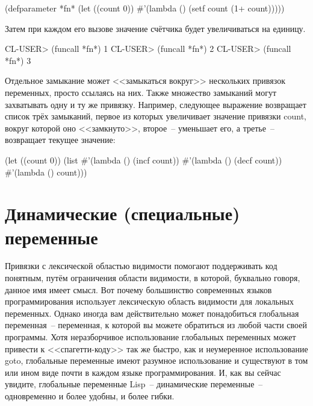 \begin{myverb}
(defparameter *fn* (let ((count 0)) #'(lambda () (setf count (1+ count)))))
\end{myverb}

Затем при каждом его вызове значение счётчика будет увеличиваться на единицу.

\begin{myverb}
CL-USER> (funcall *fn*)
1
CL-USER> (funcall *fn*)
2
CL-USER> (funcall *fn*)
3
\end{myverb}

Отдельное замыкание может <<замыкаться вокруг>> нескольких привязок переменных, просто
ссылаясь на них. Также множество замыканий могут захватывать одну и ту же
привязку. Например, следующее выражение возвращает список трёх замыканий, первое из
которых увеличивает значение привязки count, вокруг которой оно <<замкнуто>>, второе~--
уменьшает его, а третье~-- возвращает текущее значение:

\begin{myverb}
(let ((count 0))
  (list
   #'(lambda () (incf count))
   #'(lambda () (decf count))
   #'(lambda () count)))
\end{myverb}

\section{Динамические (специальные) переменные}

Привязки с лексической областью видимости помогают поддерживать код понятным, путём
ограничения области видимости, в которой, буквально говоря, данное имя имеет смысл. Вот
почему большинство современных языков программирования использует лексическую область
видимости для локальных переменных. Однако иногда вам действительно может понадобиться
глобальная переменная~-- переменная, к которой вы можете обратиться из любой части своей
программы. Хотя неразборчивое использование глобальных переменных может привести к
<<спагетти-коду>> так же быстро, как и неумеренное использование goto, глобальные переменные
имеют разумное использование и существуют в том или ином виде почти в каждом языке
программирования. И, как вы
сейчас увидите, глобальные переменные Lisp~-- динамические переменные~-- одновременно и
более удобны, и более гибки.

